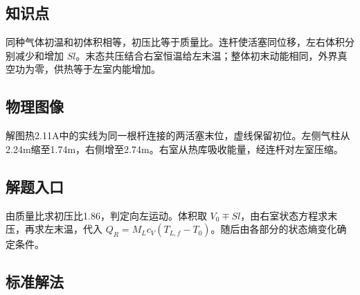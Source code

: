 \documentclass[UTF8,fontset=fandol,a4paper,11pt]{ctexart}
\begin{document}

\subsection*{知识点}

同种气体初温和初体积相等，初压比等于质量比。连杆使活塞同位移，左右体积分别减少和增加 $Sl$。末态共压结合右室恒温给左末温；整体初末动能相同，外界真空功为零，供热等于左室内能增加。




\subsection*{物理图像}

解图热2.11A中的实线为同一根杆连接的两活塞末位，虚线保留初位。左侧气柱从2.24m缩至1.74m，右侧增至2.74m。右室从热库吸收能量，经连杆对左室压缩。



\subsection*{解题入口}

由质量比求初压比1.86，判定向左运动。体积取 $V_0\mp Sl$，由右室状态方程求末压，再求左末温，代入 $Q_R=M_Lc_V(T_{L,f}-T_0)$。随后由各部分的状态熵变化确定条件。




\subsection*{标准解法}
\end{document}
